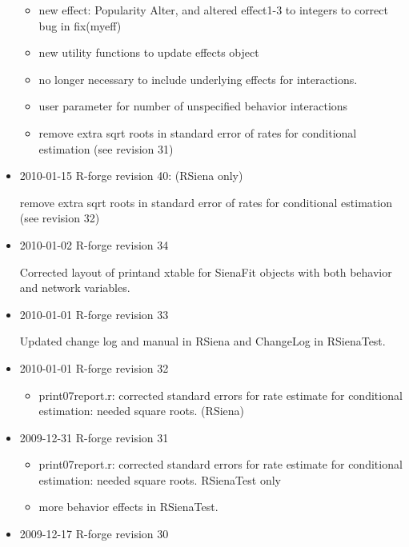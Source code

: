 \documentclass[a4paper,fleqn,11pt]{article}
\newcommand{\+}{\, + \,}
\newcommand{\sfn}[1]{\textsf{#1}}
\begin{document}
\begin{small}
\begin{itemize}
\begin{itemize}
\item
   new effect: Popularity Alter, and altered effect1-3 to integers to correct
  bug in fix(myeff)
  \item new utility functions to update effects object
  \item no longer
  necessary to include underlying effects for interactions.
  \item user parameter for number of unspecified behavior interactions
  \item  remove extra sqrt roots in standard error of rates for conditional
  estimation (see revision 31)
\end{itemize}
\item 2010-01-15 R-forge revision 40: (\textsf{RSiena} only)

  remove extra sqrt roots in standard error of rates for conditional
  estimation (see revision 32)


\item 2010-01-02 R-forge revision 34

  Corrected layout of \textsf{print}and \sfn{xtable} for \sfn{SienaFit} objects
  with both behavior and network variables.

\item 2010-01-01 R-forge revision 33

Updated change log and manual in \textsf{RSiena} and \sfn{ChangeLog} in \textsf{RSienaTest}.

\item 2010-01-01 R-forge revision 32
\begin{itemize}
\item
    print07report.r: corrected standard errors for rate estimate for
    conditional estimation: needed square roots. (\textsf{RSiena})
\end{itemize}

\item 2009-12-31 R-forge revision 31
\begin{itemize}
\item
    print07report.r: corrected standard errors for rate estimate for
    conditional estimation: needed square roots. \textsf{RSienaTest} only

\item more behavior effects in \textsf{RSienaTest}.
\end{itemize}

\item 2009-12-17 R-forge revision 30


\end{itemize}
\end{small}
\end{document}
